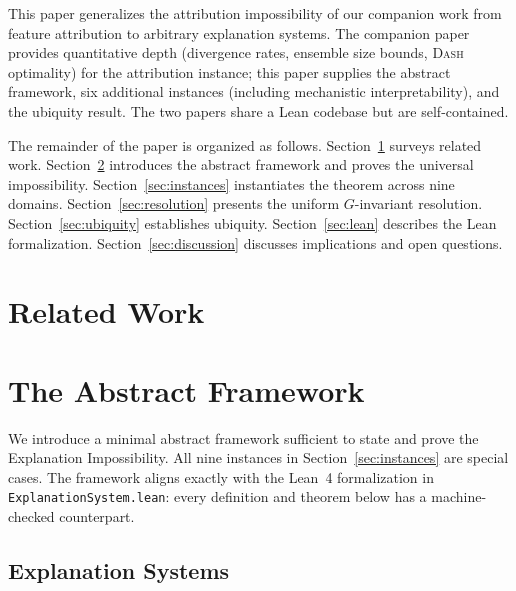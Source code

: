 \documentclass{article}
\newcommand{\DASH}{\textsc{Dash}}
\begin{document}
This paper generalizes the attribution impossibility of our companion work
\citep{bilodeau2024impossibility} from feature attribution to arbitrary
explanation systems.  The companion paper provides quantitative depth
(divergence rates, ensemble size bounds, \DASH{} optimality) for the
attribution instance; this paper supplies the abstract framework, six
additional instances (including mechanistic interpretability), and the
ubiquity result.  The two papers share a
Lean codebase but are self-contained.

The remainder of the paper is organized as follows.
Section~\ref{sec:related} surveys related work.
Section~\ref{sec:framework} introduces the abstract framework and proves
the universal impossibility.  Section~\ref{sec:instances} instantiates the
theorem across nine domains.  Section~\ref{sec:resolution} presents the
uniform $G$-invariant resolution.  Section~\ref{sec:ubiquity} establishes
ubiquity.  Section~\ref{sec:lean} describes the Lean formalization.
Section~\ref{sec:discussion} discusses implications and open questions.

\section{Related Work}
\label{sec:related}



\section{The Abstract Framework}
\label{sec:framework}

We introduce a minimal abstract framework sufficient to state and prove the
Explanation Impossibility.  All nine instances in
Section~\ref{sec:instances} are special cases.
The framework aligns exactly with the Lean~4 formalization in
\texttt{ExplanationSystem.lean}: every definition and theorem below has a
machine-checked counterpart.

\subsection{Explanation Systems}
\end{document}
